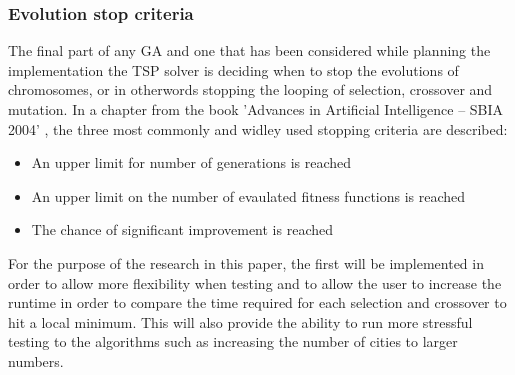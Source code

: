 \documentclass[article]{IEEEtran}
\begin{document}
\subsubsection{Evolution stop criteria}
The final part of any GA and one that has been considered while planning the implementation the TSP solver is deciding when to stop the evolutions of chromosomes, or in otherwords stopping the looping of selection, crossover and mutation. In a chapter from the book 'Advances in Artificial Intelligence – SBIA 2004' \cite{9}, the three most commonly and widley used stopping criteria are described:
\begin{itemize}
\item An upper limit for number of generations is reached
\item An upper limit on the number of evaulated fitness functions is reached
\item The chance of significant improvement is reached
\end{itemize}
For the purpose of the research in this paper, the first will be implemented in order to allow more flexibility when testing and to allow the user to increase the runtime in order to compare the time required for each selection and crossover to hit a local minimum. This will also provide the ability to run more stressful testing to the algorithms such as increasing the number of cities to larger numbers.
\end{document}
